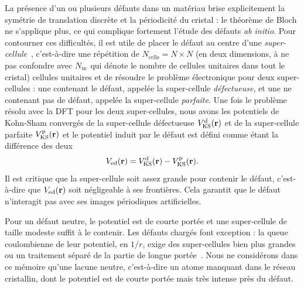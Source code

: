 La présence d'un ou plusieurs défauts dans un matériau brise explicitement la symétrie de translation discrète et la périodicité du cristal : le théorème de Bloch ne s'applique plus, ce qui complique fortement l'étude des défauts \textit{ab initio}. Pour contourner ces difficultés, il est utile de placer le défaut au centre d'une \textit{super-cellule}~\cite{freysoldtFirstprinciplesCalculationsPoint2014}, c'est-à-dire une répétition de $N_\text{cells} = N\times N$ (en deux dimensions, à ne pas confondre avec $N_\text{uc}$ qui dénote le nombre de cellules unitaires dans tout le cristal) cellules unitaires et de résoudre le problème électronique pour deux super-cellules : une contenant le défaut, appelée la super-cellule \textit{défectueuse}, et une ne contenant pas de défaut, appelée la super-cellule \textit{parfaite}. Une fois le problème résolu avec la DFT pour les deux super-cellules, nous avons les potentiels de Kohn-Sham convergés de la super-cellule défectueuse $V_\text{KS}^\text{d}(\mathbf{r})$ et de la super-cellule parfaite $V_\text{KS}^\text{p}(\mathbf{r})$ et le potentiel induit par le défaut est défini comme étant la différence des deux
\begin{equation}
    V_\text{ed}(\mathbf{r}) = V_\text{KS}^\text{d}(\mathbf{r}) - V_\text{KS}^\text{p}(\mathbf{r}).\label{eqn:V_ed}
\end{equation}
Il est critique que la super-cellule soit assez grande pour contenir le défaut, c'est-à-dire que $V_\text{ed}(\mathbf{r})$ soit négligeable à ses frontières. Cela garantit que le défaut n'interagit pas avec ses images périodiques artificielles.

Pour un défaut neutre, le potentiel est de courte portée et une super-cellule de taille modeste suffit à le contenir. Les défauts chargés font exception : la queue coulombienne de leur potentiel, en $1/r$, exige des super-cellules bien plus grandes ou un traitement séparé de la partie de longue portée~\cite{freysoldtFullyInitioFiniteSize2009,luFirstprinciplesIonizedimpurityScattering2021}. Nous ne considérons dans ce mémoire qu'une lacune neutre, c'est-à-dire un atome manquant dans le réseau cristallin, dont le potentiel est de courte portée mais très intense près du défaut.

